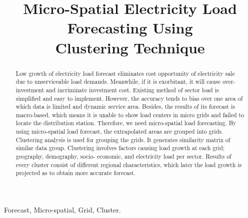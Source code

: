 \documentclass[conference]{IEEEtran}
\begin{document}
\makeatletter
\newcommand{\linebreakand}{%
  \end{@IEEEauthorhalign}
  \hfill\mbox{}\par
  \mbox{}\hfill\begin{@IEEEauthorhalign}
}
\makeatother

\title{Micro-Spatial Electricity Load Forecasting Using
\\ Clustering Technique}
\author{
    \and
    \and
    }
\maketitle


\begin{abstract}
    Low growth of electricity load forecast eliminates cost opportunity of electricity sale due to
    unserviceable load demands. Meanwhile, if it is exorbitant, it will cause over-investment and incriminate investment
    cost. Existing method of sector load is simplified and easy to implement. However, the accuracy tends to bias over
    one area of which data is limited and dynamic service area. Besides, the results of its forecast is macro-based,
    which means it is unable to show load centers in micro grids and failed to locate the distribution station.
    Therefore, we need micro-spatial load forecasting. By
    using micro-spatial load forecast, the extrapolated areas
    are grouped into grids. Clustering analysis is used for
    grouping the grids. It generates similarity matrix of similar
    data group. Clustering involves factors causing load
    growth at each grid; geography, demography, socio-
    economic, and electricity load per sector. Results of every
    cluster consist of different regional characteristics, which
    later the load growth is projected as to obtain more
    accurate forecast.
\end{abstract}
\begin{IEEEkeywords}
    Forecast, Micro-spatial, Grid, Cluster.
\end{IEEEkeywords}
\end{document}
